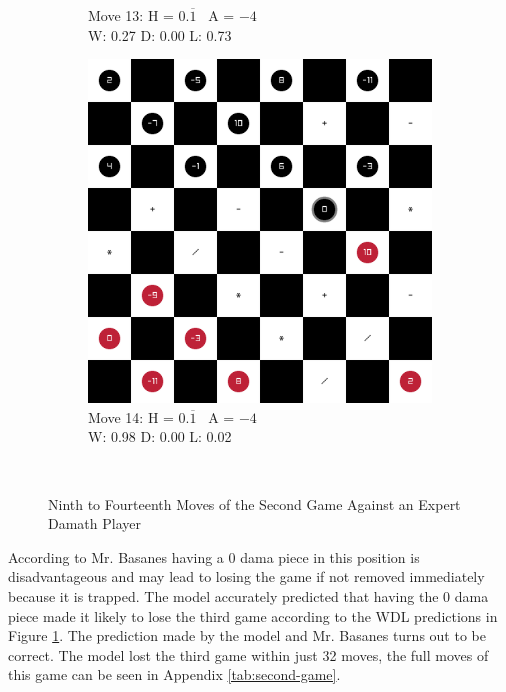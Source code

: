 \begin{figure}[H]
\begin{subfigure}{0.3\textwidth}
        \caption*{Move 13: H = $0.\overline1$ \textbar\ A = $-4$ \\ W: 0.27 D: 0.00 L: 0.73}
    \end{subfigure}
    \quad
    \begin{subfigure}{0.3\textwidth}
        \centering
        \includegraphics[width=\textwidth]{images/games/game2/move_15.png}
        \caption*{Move 14: H = $0.\overline1$ \textbar\ A = $-4$ \\ W: 0.98 D: 0.00 L: 0.02}
    \end{subfigure} \\
    \caption{Ninth to Fourteenth Moves of the Second Game Against an Expert Damath Player}
    \label{fig:9-14-game2}
\end{figure}

According to Mr. Basanes having a 0 dama piece in this position is disadvantageous and may lead to losing the game if not removed immediately because it is trapped. The model accurately predicted that having the 0 dama piece made it likely to lose the third game according to the WDL predictions in Figure \ref{fig:9-14-game2}. The prediction made by the model and Mr. Basanes turns out to be correct. The model lost the third game within just 32 moves, the full moves of this game can be seen in Appendix \ref{tab:second-game}.

